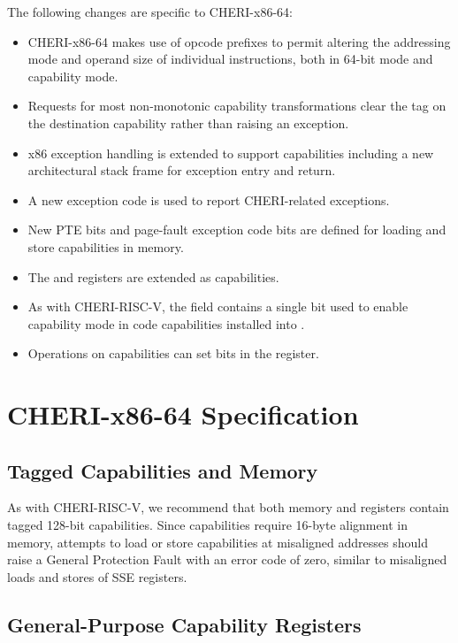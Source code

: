 The following changes are specific to CHERI-x86-64:

\begin{itemize}
 \item CHERI-x86-64 makes use of opcode prefixes to permit altering
   the addressing mode and operand size of individual instructions,
   both in 64-bit mode and capability mode.
 \item Requests for most non-monotonic capability transformations
   clear the tag on the destination capability rather than raising an
   exception.
 \item x86 exception handling is extended to support capabilities
   including a new architectural stack frame for exception entry and
   return.
 \item A new exception code is used to report CHERI-related
   exceptions.
 \item New PTE bits and page-fault exception code bits are defined for
   loading and store capabilities in memory.
 \item The \FSBASE{} and \GSBASE{} registers are extended as
   capabilities.
 \item As with CHERI-RISC-V, the \cflags{} field contains a single bit
   used to enable capability mode in code capabilities installed into
   \CIP{}.
 \item Operations on capabilities can set bits in the \RFLAGS{}
   register.
\end{itemize}

\section{CHERI-x86-64 Specification}

\subsection{Tagged Capabilities and Memory}

As with CHERI-RISC-V, we recommend that both memory and
registers contain tagged 128-bit capabilities.
Since capabilities require 16-byte alignment in memory, attempts to
load or store capabilities at misaligned addresses should raise a
General Protection Fault with an error code of zero, similar to
misaligned loads and stores of SSE registers.

\subsection{General-Purpose Capability Registers}

